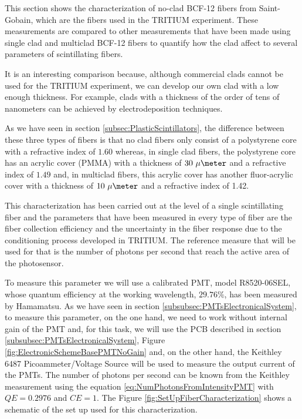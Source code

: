 This section shows the characterization of no-clad BCF-12 fibers from Saint-Gobain, which are the fibers used in the TRITIUM experiment. These measurements are compared to other measurements that have been made using single clad and multiclad BCF-12 fibers to quantify how the clad affect to several parameters of scintillating fibers.

It is an interesting comparison because, although commercial clads cannot be used for the TRITIUM experiment, we can develop our own clad with a low enough thickness. For example, clads with a thickness of the order of tens of nanometers can be achieved by electrodeposition techniques.

As we have seen in section \ref{subsec:PlasticScintillators}, the difference between these three types of fibers is that no clad fibers only consist of a polystyrene core with a refractive index of $1.60$ whereas, in single clad fibers, the polystyrene core has an acrylic cover (PMMA) with a thickness of $30~\mu\meter$ and a refractive index of $1.49$ and, in multiclad fibers, this acrylic cover has another fluor-acrylic cover with a thickness of $10~\mu\meter$ and a refractive index of 1.42.




This characterization has been carried out at the level of a single scintillating fiber and the parameters that have been measured in every type of fiber are the fiber collection efficiency and the uncertainty in the fiber response due to the conditioning process developed in TRITIUM. The reference measure that will be used for that is the number of photons per second that reach the active area of the photosensor.

To measure this parameter we will use a calibrated PMT, model R8520-06SEL, whose quantum efficiency at the working wavelength, $29.76\%$, has been measured by Hamamatsu. As we have seen in section \ref{subsubsec:PMTsElectronicalSystem}, to measure this parameter, on the one hand, we need to work without internal gain of the PMT and, for this task, we will use the PCB described in section \ref{subsubsec:PMTsElectronicalSystem}, Figure \ref{fig:ElectronicSchemeBasePMTNoGain} and, on the other hand, the Keithley 6487 Picoammeter/Voltage Source will be used to measure the output current of the PMTs. The number of photons per second can be known from the Keithley measurement using the equation \ref{eq:NumPhotonsFromIntensityPMT} with $QE=0.2976$ and $CE=1$. The Figure \ref{fig:SetUpFiberCharacterization} shows a schematic of the set up used for this characterization.

